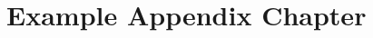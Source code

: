 \documentclass[draft,final]{istaustriathesis}
\begin{document}
\backmatter
\pagestyle{plain}


\mainmatter* %
\appendix %

\chapter{Example Appendix Chapter}

\backmatter
\makeatletter{}\makeatother %
\todototoc %
\listoftodos %
\end{document}
